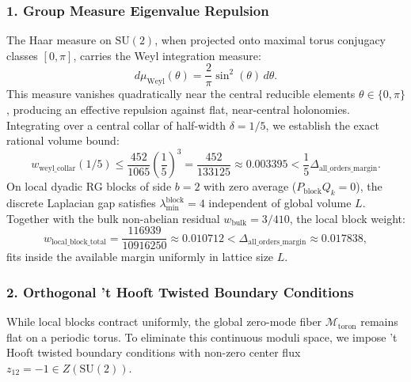 \documentclass[11pt,a4paper]{article}
\theoremstyle{definition}
\theoremstyle{remark}
\newcommand{\SU}{\mathrm{SU}}
\begin{document}
\subsubsection{1. Group Measure Eigenvalue Repulsion}
The Haar measure on $\SU(2)$, when projected onto maximal torus conjugacy classes $[0, \pi]$, carries the Weyl integration measure:
\begin{equation}
d\mu_{\mathrm{Weyl}}(\theta) = \frac{2}{\pi} \sin^2(\theta) \, d\theta.
\end{equation}
This measure vanishes quadratically near the central reducible elements $\theta \in \{0, \pi\}$, producing an effective repulsion against flat, near-central holonomies. Integrating over a central collar of half-width $\delta = 1/5$, we establish the exact rational volume bound:
\begin{equation}
w_{\mathrm{weyl\_collar}}(1/5) \le \frac{452}{1065} \left(\frac{1}{5}\right)^3 = \frac{452}{133125} \approx 0.003395 < \frac{1}{5} \Delta_{\mathrm{all\_orders\_margin}}.
\end{equation}
On local dyadic RG blocks of side $b = 2$ with zero average ($P_{\mathrm{block}} Q_k = 0$), the discrete Laplacian gap satisfies $\lambda_{\min}^{\mathrm{block}} = 4$ independent of global volume $L$. Together with the bulk non-abelian residual $w_{\mathrm{bulk}} = 3/410$, the local block weight:
\begin{equation}
w_{\mathrm{local\_block\_total}} = \frac{116939}{10916250} \approx 0.010712 < \Delta_{\mathrm{all\_orders\_margin}} \approx 0.017838,
\end{equation}
fits inside the available margin uniformly in lattice size $L$.

\subsubsection{2. Orthogonal 't Hooft Twisted Boundary Conditions}
While local blocks contract uniformly, the global zero-mode fiber $\mathcal{M}_{\mathrm{toron}}$ remains flat on a periodic torus. To eliminate this continuous moduli space, we impose 't Hooft twisted boundary conditions \cite{tHooft1978,tHooft1979} with non-zero center flux $z_{12} = -1 \in Z(\SU(2))$.
\end{document}

